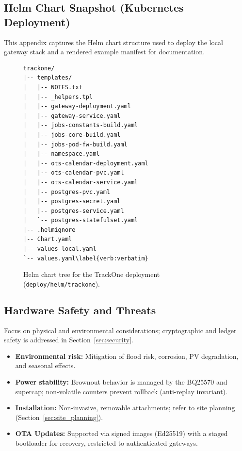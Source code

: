 \subsection{Helm Chart Snapshot (Kubernetes Deployment)}\label{subsec:helm-chart-snapshot-(kubernetes-deployment)}
This appendix captures the Helm chart structure used to deploy the local gateway stack and a rendered example manifest for documentation.

\begin{figure}[H]
  \centering
  \begin{minipage}{0.95\linewidth}
  \begin{verbatim}
trackone/
|-- templates/
|   |-- NOTES.txt
|   |-- _helpers.tpl
|   |-- gateway-deployment.yaml
|   |-- gateway-service.yaml
|   |-- jobs-constants-build.yaml
|   |-- jobs-core-build.yaml
|   |-- jobs-pod-fw-build.yaml
|   |-- namespace.yaml
|   |-- ots-calendar-deployment.yaml
|   |-- ots-calendar-pvc.yaml
|   |-- ots-calendar-service.yaml
|   |-- postgres-pvc.yaml
|   |-- postgres-secret.yaml
|   |-- postgres-service.yaml
|   `-- postgres-statefulset.yaml
|-- .helmignore
|-- Chart.yaml
|-- values-local.yaml
`-- values.yaml\label{verb:verbatim}
  \end{verbatim}
  \end{minipage}
  \caption{Helm chart tree for the TrackOne deployment (\texttt{deploy/helm/trackone}).}
  \label{fig:helm-chart-tree}
\end{figure}

\subsection{Hardware Safety and Threats}\label{subsec:hardware-safety-and-threats}
Focus on physical and environmental considerations; cryptographic and ledger safety is addressed in Section~\ref{sec:security}.
\begin{itemize}[nosep]
  \item \textbf{Environmental risk:} Mitigation of flood risk, corrosion, PV degradation, and seasonal effects.
  \item \textbf{Power stability:} Brownout behavior is managed by the BQ25570 and supercap; non-volatile counters prevent rollback (anti-replay invariant).
  \item \textbf{Installation:} Non-invasive, removable attachments; refer to site planning (Section~\ref{sec:site_planning}).
  \item \textbf{\ac{OTA} Updates:} Supported via signed images (Ed25519) with a staged bootloader for recovery, restricted to authenticated gateways.
\end{itemize}


